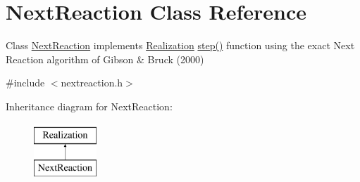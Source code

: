 \hypertarget{class_next_reaction}{}\section{Next\+Reaction Class Reference}
\label{class_next_reaction}


Class \hyperlink{class_next_reaction}{Next\+Reaction} implements \hyperlink{class_realization}{Realization} \hyperlink{class_next_reaction_a2c1502879c76efe398c2947056936725}{step()} function using the exact Next Reaction algorithm of Gibson \& Bruck (2000)  




{\ttfamily \#include $<$nextreaction.\+h$>$}

Inheritance diagram for Next\+Reaction\+:\begin{figure}[H]
\begin{center}
\leavevmode
\includegraphics[height=2.000000cm]{class_next_reaction}
\end{center}
\end{figure}
